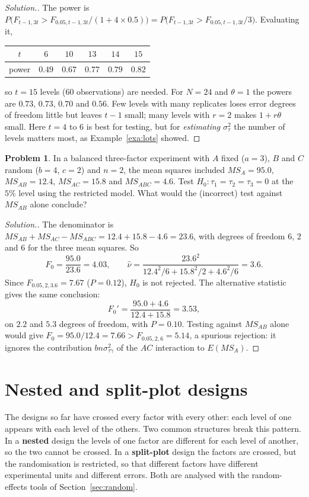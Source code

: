 \documentclass[11pt,a4paper]{article}
\numberwithin{equation}{section}
\theoremstyle{definition}
\newtheorem{problemx}{Problem}[subsection]
\newenvironment{problem}{\begin{problemx}}{\end{problemx}}
\newenvironment{solution}
  {\renewcommand{\qedsymbol}{}\begin{proof}[\textit{Solution}.]}
  {\end{proof}}
\begin{document}
\begin{solution}
The power is $P\bigl(F_{t-1, 3t} > F_{0.05, t-1, 3t}/(1 + 4\times0.5)\bigr) = P\bigl(F_{t-1, 3t} > F_{0.05, t-1, 3t}/3\bigr)$. Evaluating it,
\begin{center}
\begin{tabular}{c|ccccc}
$t$ & $6$ & $10$ & $13$ & $14$ & $15$ \\
\hline
power & $0.49$ & $0.67$ & $0.77$ & $0.79$ & $0.82$
\end{tabular}
\end{center}
so $t = 15$ levels (60 observations) are needed. For $N = 24$ and $\theta = 1$ the powers are $0.73$, $0.73$, $0.70$ and $0.56$. Few levels with many replicates loses error degrees
of freedom little but leaves $t - 1$ small; many levels with $r = 2$ makes $1 + r\theta$ small. Here $t = 4$ to $6$ is best for testing, but for \emph{estimating} $\sigma^2_\tau$ the number
of levels matters most, as Example~\ref{exa:lots} showed.
\end{solution}

\begin{problem}
In a balanced three-factor experiment with $A$ fixed ($a = 3$), $B$ and $C$ random ($b = 4$, $c = 2$) and $n = 2$, the mean squares included $MS_A = 95.0$, $MS_{AB} = 12.4$,
$MS_{AC} = 15.8$ and $MS_{ABC} = 4.6$. Test $H_0 : \tau_1 = \tau_2 = \tau_3 = 0$ at the $5\%$ level using the restricted model. What would the (incorrect) test against $MS_{AB}$ alone
conclude?
\end{problem}

\begin{solution}
The denominator is $MS_{AB} + MS_{AC} - MS_{ABC} = 12.4 + 15.8 - 4.6 = 23.6$, with degrees of freedom $6$, $2$ and $6$ for the three mean squares. So
\[
F_0 = \frac{95.0}{23.6} = 4.03 , \qquad \hat\nu = \frac{23.6^2}{12.4^2/6 + 15.8^2/2 + 4.6^2/6} = 3.6 .
\]
Since $F_{0.05, 2, 3.6} = 7.67$ ($P = 0.12$), $H_0$ is not rejected. The alternative statistic gives the same conclusion:
\[
F_0' = \frac{95.0 + 4.6}{12.4 + 15.8} = 3.53 ,
\]
on $2.2$ and $5.3$ degrees of freedom, with $P = 0.10$. Testing against $MS_{AB}$ alone would give $F_0 = 95.0/12.4 = 7.66 > F_{0.05, 2, 6} = 5.14$, a spurious rejection: it ignores the
contribution $bn\sigma^2_{\tau\gamma}$ of the $AC$ interaction to $E(MS_A)$.
\end{solution}

\section{Nested and split-plot designs}\label{sec:nested}
The designs so far have crossed every factor with every other: each level of one appears with each level of the others. Two common structures
break this pattern. In a \textbf{nested} design the levels of one factor are different for each level of another, so the two cannot be crossed. In a
\textbf{split-plot} design the factors are crossed, but the randomisation is restricted, so that different factors have different experimental
units and different errors. Both are analysed with the random-effects tools of Section~\ref{sec:random}.
\end{document}
